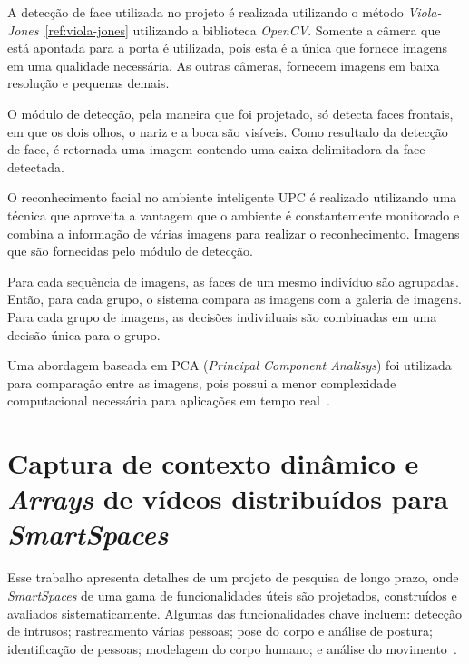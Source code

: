 A detecção de face utilizada no projeto é realizada utilizando o método \textit{Viola-Jones}~\ref{ref:viola-jones} utilizando a biblioteca \textit{OpenCV}. Somente a câmera que está apontada para a porta é utilizada, pois esta é a única que fornece imagens em uma qualidade necessária. As outras câmeras, fornecem imagens em baixa resolução e pequenas demais.  

O módulo de detecção, pela maneira que foi projetado, só detecta faces frontais, em que os dois olhos, o nariz e a boca são visíveis. Como resultado da detecção de face, é retornada uma imagem contendo uma caixa delimitadora da face detectada.

O reconhecimento facial no ambiente inteligente UPC é realizado utilizando uma técnica que aproveita a vantagem que o ambiente é constantemente monitorado e combina a informação de várias imagens para realizar o reconhecimento.  Imagens que são fornecidas pelo módulo de detecção.

Para cada sequência de imagens, as faces de um mesmo indivíduo são agrupadas. Então, para cada grupo, o sistema compara as imagens com a galeria de imagens. Para cada grupo de imagens, as decisões individuais são combinadas em uma decisão única para o grupo.

Uma abordagem baseada em PCA (\textit{Principal Component Analisys}) foi utilizada para comparação entre as imagens, pois possui a menor complexidade computacional necessária para aplicações em tempo real~\cite{salah}.


\section{Captura de contexto dinâmico e \textit{Arrays} de vídeos distribuídos para \textit{SmartSpaces}}

Esse trabalho apresenta detalhes de um projeto de pesquisa de longo prazo, onde \textit{SmartSpaces} de uma gama de funcionalidades úteis são projetados, construídos e avaliados sistematicamente. Algumas das funcionalidades chave incluem: detecção de intrusos; rastreamento várias pessoas; pose do corpo e análise de postura; identificação de pessoas; modelagem do corpo humano; e análise do movimento~\cite{trivedi}.

